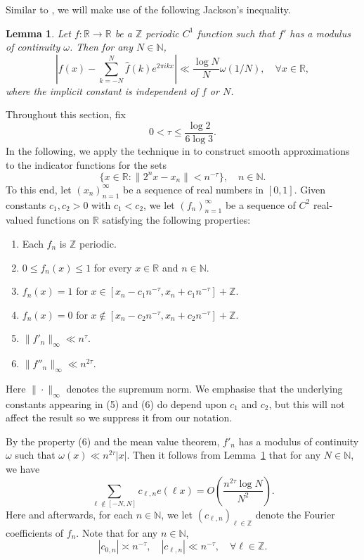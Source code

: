 \documentclass[10pt,a4paper]{amsart}
\makeatletter
\numberwithin{equation}{section} %
\newtheorem{lem}[thm]{Lemma}
\newcommand{\R}{\mathbb{R}}
\newcommand{\N}{\mathbb{N}}
\newcommand{\Z}{\mathbb{Z}}
\newcommand{\Rmnum}[1]{\expandafter\@slowromancap\romannumeral #1@}
\makeatother
\begin{document}
Similar to \cite{Baker25A}, we will make use of the following Jackson's inequality. 

\begin{lem}\cite[Theorem \Rmnum{4}, Chapter 1]{Jackson94T}\label{Jacksoninq}
	Let \( f : \mathbb{R} \to \mathbb{R} \) be a \( \mathbb{Z} \) periodic \( C^1 \) function such that $f'$ has a modulus of continuity \( \omega \). Then for any $N\in\N$, 
	\[
	\left| f(x) - \sum_{k=-N}^N \widehat{f}(k)e^{2\pi ik x} \right| \ll  \frac{\log N}{N} \omega(1/N), \quad \forall x\in \R,
	\]
 where the implicit constant is independent of \( f \) or \( N \).
\end{lem}

Throughout this section, fix  $$0<\tau\leq \frac{\log2}{6\log3}.$$ 
In the following, 
we  apply the technique in \cite{Baker25A} to construct smooth approximations to the indicator  functions for the sets 
\[\{x\in \R: \|2^{n}x-x_n\|<n^{-\tau}\}, \quad n\in\N.\]
To this end, let $(x_{n})_{n=1}^{\infty}$ be a sequence of real numbers in $[0,1]$. Given constants $c_{1},c_{2}>0$ with $c_{1}<c_{2}$, we let $(f_n)_{n=1}^{\infty}$ be a sequence of $C^2$ real-valued functions on $\R$ satisfying the following properties:
\begin{enumerate}
	\item Each $f_n$ is $\mathbb{Z}$ periodic.
	\item $0\leq f_{n}(x)\leq 1$ for every $x\in\mathbb{R}$ and $n\in \mathbb{N}$.
	\item $f_{n}(x)=1$ for $x\in [x_n-c_{1}n^{-\tau},x_n+c_{1}n^{-\tau}]+\mathbb{Z}.$
	\item $f_{n}(x)=0$ for $x\notin [x_n-c_{2}n^{-\tau},x_n+c_{2}n^{-\tau}]+\mathbb{Z}.$
	\item $\|f'_{n}\|_{\infty}\ll n^{\tau}.$
	\item $\|f''_{n}\|_{\infty}\ll n^{2\tau}.$
\end{enumerate}
Here $\|\cdot\|_{\infty}$ denotes the supremum norm. We emphasise that the underlying constants appearing in (5) and (6) do depend upon $c_{1}$ and $c_{2}$, but this will not affect the result so we suppress it from our notation. 

By the property (6) and the mean value theorem, $f'_n$ has a  modulus of continuity $\omega$ such that $\omega(x)\ll n^{2\tau}|x|$. Then it follows from Lemma~\ref{Jacksoninq} that for any $N\in\N$, we have 
\begin{equation}
	\label{errorbound}
	\sum_{\ell\notin [-N,N]}c_{\ell,n}e(\ell x)=O\left(\frac{n^{2\tau}\log N}{N^{2}}\right).
\end{equation}
Here and afterwards, for each $n\in\mathbb{N}$, we let $(c_{\ell,n})_{\ell \in\mathbb{Z}}$ denote the Fourier coefficients of $f_n$. Note that for any $n\in\N$, 
\begin{equation}\label{cellnasy}
|c_{0,n}|\asymp n^{-\tau}, \quad |c_{\ell,n}|\ll n^{-\tau},\quad  \forall \ell\in \Z. 
\end{equation}
\end{document}
